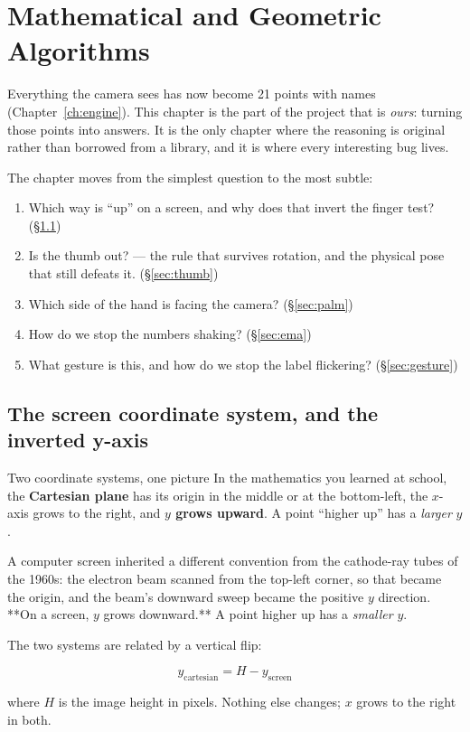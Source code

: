 \chapter{Mathematical and Geometric Algorithms}
\label{ch:math}

Everything the camera sees has now become 21 points with names (Chapter~\ref{ch:engine}). This
chapter is the part of the project that is \emph{ours}: turning those points into answers. It is the
only chapter where the reasoning is original rather than borrowed from a library, and it is where
every interesting bug lives.

The chapter moves from the simplest question to the most subtle:

\begin{enumerate}
  \item Which way is ``up'' on a screen, and why does that invert the finger test?
        (\S\ref{sec:screencs})
  \item Is the thumb out? --- the rule that survives rotation, and the physical pose that still
        defeats it. (\S\ref{sec:thumb})
  \item Which side of the hand is facing the camera? (\S\ref{sec:palm})
  \item How do we stop the numbers shaking? (\S\ref{sec:ema})
  \item What gesture is this, and how do we stop the label flickering? (\S\ref{sec:gesture})
\end{enumerate}

\section{The screen coordinate system, and the inverted y-axis}
\label{sec:screencs}

\begin{mathdeepdive}{Two coordinate systems, one picture}
In the mathematics you learned at school, the \textbf{Cartesian plane} has its origin in the middle
or at the bottom-left, the $x$-axis grows to the right, and \textbf{$y$ grows upward}. A point
``higher up'' has a \emph{larger} $y$.

A computer screen inherited a different convention from the cathode-ray tubes of the 1960s: the
electron beam scanned from the top-left corner, so that became the origin, and the beam's downward
sweep became the positive $y$ direction. **On a screen, $y$ grows downward.** A point higher up has a
\emph{smaller} $y$.

The two systems are related by a vertical flip:

$$y_{\text{cartesian}} = H - y_{\text{screen}}$$

where $H$ is the image height in pixels. Nothing else changes; $x$ grows to the right in both.
\end{mathdeepdive}


